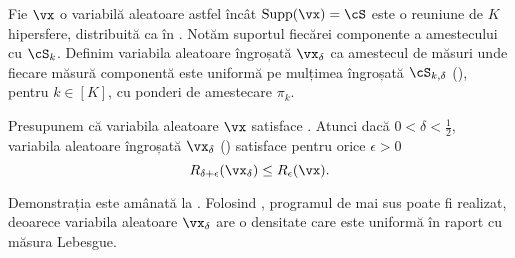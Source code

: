 \documentclass[../../book-main_ro.tex]{subfiles}
\begin{document}
\begin{definition}\label{def:thickening-rv-uos}
    Fie $\vx$ o variabilă aleatoare astfel încât $\Supp(\vx) = \cS$ este o reuniune de
    $K$ hipersfere, distribuită ca în .
    Notăm suportul fiecărei componente a amestecului cu $\cS_k$.
    Definim variabila aleatoare îngroșată $\vx_{\delta}$ ca amestecul de
    măsuri unde fiecare măsură componentă este uniformă pe mulțimea îngroșată
    $\cS_{k, \delta}$ (), pentru $k \in [K]$, cu ponderi de
    amestecare $\pi_k$.
\end{definition}


\begin{lemma}\label{lem:rate-distortion-lb-uos}
    Presupunem că variabila aleatoare $\vx$ satisface
    . Atunci dacă $0 < \delta < \tfrac{1}{2}$,
    variabila aleatoare îngroșată $\vx_{\delta}$ ()
    satisface pentru orice $\epsilon > 0$
    \begin{equation}
        R_{\delta + \epsilon}(\vx_{\delta})
        \leq
        R_{\epsilon}(\vx).
    \end{equation}
\end{lemma}

Demonstrația  este amânată la
.
Folosind , programul de mai sus poate fi realizat,
deoarece variabila aleatoare $\vx_{\delta}$ are o densitate care este uniformă în
raport cu măsura Lebesgue.
\end{document}
